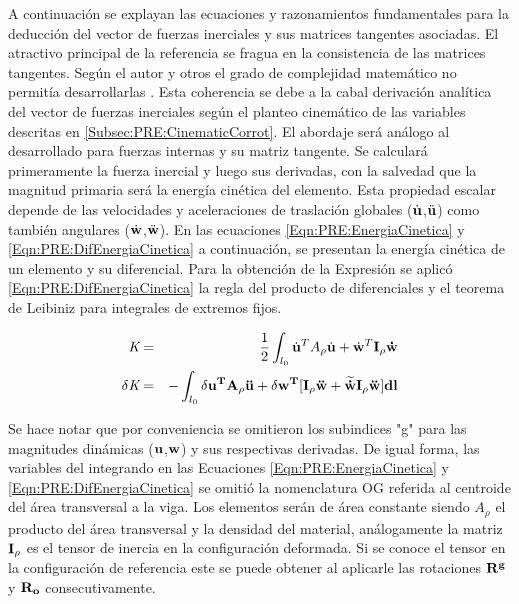A continuación se explayan las ecuaciones y razonamientos fundamentales para la deducción del vector de fuerzas inerciales y sus matrices tangentes asociadas. El atractivo principal de la referencia \citet{Le2014} se fragua en la consistencia de las matrices tangentes. Según el autor y otros el grado de complejidad matemático no permitía desarrollarlas \cite{Crisfield}. Esta coherencia se debe a la cabal derivación analítica del vector de fuerzas inerciales según el planteo cinemático de las variables descritas en \ref{Subsec:PRE:CinematicCorrot}. El abordaje será análogo al desarrollado para fuerzas internas y su matriz tangente. Se calculará primeramente la fuerza inercial y luego sus derivadas, con la salvedad que la magnitud primaria será la energía cinética del elemento. Esta propiedad escalar depende de las velocidades y aceleraciones de traslación globales ($\dot{\bf{u}}$,$\ddot{\bf{u}}$) como también angulares ($\dot{\bf{w}}$,$\ddot{\bf{w}}$). En las ecuaciones \eqref{Eqn:PRE:EnergiaCinetica} y \eqref{Eqn:PRE:DifEnergiaCinetica} a continuación, se presentan la energía cinética de un elemento y su diferencial. Para la obtención de la Expresión se aplicó \eqref{Eqn:PRE:DifEnergiaCinetica} la regla del producto de diferenciales y el teorema de Leibiniz para integrales de extremos fijos. 

\begin{eqnarray}
		\textit{K}&=&\frac{1}{2}\int_{l_0} \dot{\bf{u}}^T A_{\rho} \dot{\bf{u}} +
		\dot{\bf{w}}^T \bf{I_{\rho}}\dot{\bf{w}}
		\label{Eqn:PRE:EnergiaCinetica}\\
		\delta\textit{K}&=&-\int_{l_0} \delta \bf{u}^T A_{\rho} \ddot{\bf{u}} +\delta
		\bf{w}^T[\bf{I_{\rho}}\ddot{\bf{w}}+\widetilde{\dot{\bf{w}}}\bf{I_{\rho}}\ddot{\bf{w}}]
		dl	
		\label{Eqn:PRE:DifEnergiaCinetica}
\end{eqnarray}


Se hace notar que por conveniencia se omitieron los subindices "g" para las magnitudes dinámicas ($\bf{u}$,$\bf{w}$)  y sus respectivas derivadas. De igual forma, las variables del integrando en las Ecuaciones  \eqref{Eqn:PRE:EnergiaCinetica} y \eqref{Eqn:PRE:DifEnergiaCinetica} se omitió la nomenclatura OG referida al centroide del área transversal a la viga. Los elementos serán de área constante siendo  $A_{\rho}$  el producto del área transversal  y la densidad del material, análogamente la matriz $\bf{I_{\rho}}$ es el tensor de inercia en la configuración deformada. Si se conoce el tensor en la configuración de referencia este se puede obtener al aplicarle las rotaciones $\bf{R}^g$ y $\bf{R}_o$ consecutivamente. 
  
